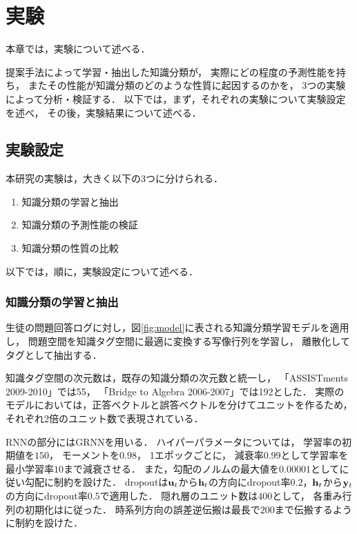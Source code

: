 \chapter{実験}
\label{chap:result}
\fancyhf{}
\rhead{\thepage}
\cfoot{\thepage}


本章では，実験について述べる．

提案手法によって学習・抽出した知識分類が，
実際にどの程度の予測性能を持ち，
またその性能が知識分類のどのような性質に起因するのかを，
3つの実験によって分析・検証する．
以下では，まず，それぞれの実験について実験設定を述べ，
その後，実験結果について述べる．


\section{実験設定}

本研究の実験は，大きく以下の3つに分けられる．
\begin{enumerate}
	\item 知識分類の学習と抽出
	\item 知識分類の予測性能の検証
	\item 知識分類の性質の比較
\end{enumerate}
以下では，順に，実験設定について述べる．


\subsection{知識分類の学習と抽出}
\label{sec:section}
生徒の問題回答ログに対し，図\ref{fig:model}に表される知識分類学習モデルを適用し，
問題空間を知識タグ空間に最適に変換する写像行列を学習し，
離散化してタグとして抽出する．

知識タグ空間の次元数は，既存の知識分類の次元数と統一し，
「ASSISTments 2009-2010」では55，
「Bridge to Algebra 2006-2007」では192とした．
実際のモデルにおいては，正答ベクトルと誤答ベクトルを分けてユニットを作るため，
それぞれ2倍のユニット数で表現されている．

RNNの部分にはGRNNを用いる．
ハイパーパラメータについては，
学習率の初期値を$150$，
モーメントを$0.98$，
1エポックごとに，
減衰率$0.99$として学習率を最小学習率$10$まで減衰させる．
また，勾配のノルムの最大値を$0.00001$として\cite{pascanu2013difficulty}に従い勾配に制約を設けた．
dropoutは${\bf u}_t$から${\bf h}_t$の方向にdropout率$0.2$，${\bf h}_t$から${\bf y}_t$の方向にdropout率$0.5$で適用した．
隠れ層のユニット数は$400$として，
各重み行列の初期化は\cite{glorot2010understanding}に従った．
時系列方向の誤差逆伝搬は最長で$200$まで伝搬するように制約を設けた．

